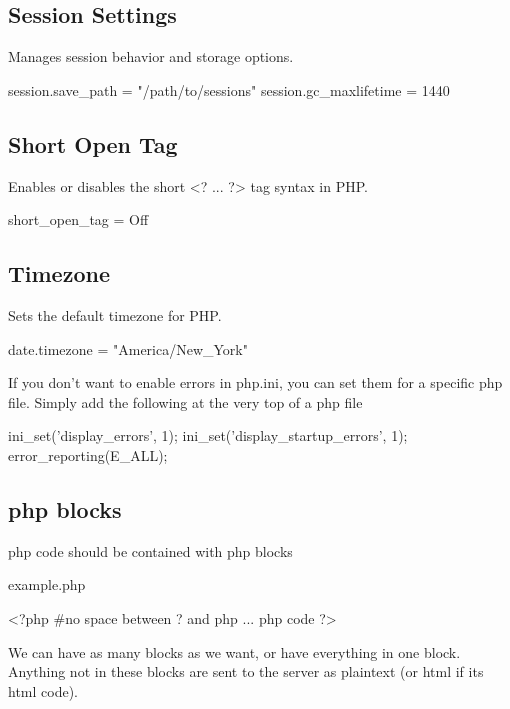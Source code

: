 \documentclass{report}
\begin{document}
    \subsection{Session Settings}
    \bigbreak \noindent 
    Manages session behavior and storage options.
    \bigbreak \noindent 
    \begin{phpcode}
        session.save_path = "/path/to/sessions"
        session.gc_maxlifetime = 1440
    \end{phpcode}
    \bigbreak \noindent 
    \subsection{Short Open Tag}
    \bigbreak \noindent 
    Enables or disables the short <? ... ?> tag syntax in PHP.
    \bigbreak \noindent 
    \begin{phpcode}
    short_open_tag = Off
    \end{phpcode}
    \bigbreak \noindent 
    \subsection{Timezone}
    \bigbreak \noindent 
    Sets the default timezone for PHP.
    \bigbreak \noindent 
    \begin{phpcode}
    date.timezone = "America/New_York"
    \end{phpcode}

    \pagebreak 
    \bigbreak \noindent 
    If you don't want to enable errors in php.ini, you can set them for a specific php file. Simply add the following at the very top of a php file
    \bigbreak \noindent 
    \begin{phpcode}
        ini_set('display_errors', 1);
        ini_set('display_startup_errors', 1);
        error_reporting(E_ALL);
    \end{phpcode}






    \pagebreak 
    \bigbreak \noindent 
    \subsection{php blocks}
    \bigbreak \noindent 
    php code should be contained with php blocks
    \bigbreak \noindent 
    \begin{phpcode}
    example.php

    <?php #no space between ? and php
        ... php code
    ?>
    \end{phpcode}
    \bigbreak \noindent 
    We can have as many blocks as we want, or have everything in one block. Anything not in these blocks are sent to the server as plaintext (or html if its html code).
    \bigbreak \noindent 
\end{document}
